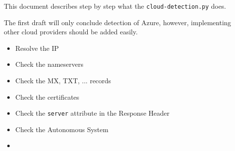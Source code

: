 \documentclass[12pt]{article}
\begin{document}
\thispagestyle{firstpage}

\begin{center}
    This document describes step by step what the \verb|cloud-detection.py| does. \\
\end{center}
The first draft will only conclude detection of Azure, however, implementing other cloud providers should be added easily.
\begin{itemize}
    \item Resolve the IP 
    \item Check the nameservers
    \item Check the MX, TXT, ... records
    \item Check the certificates
    \item Check the \verb|server| attribute in the Response Header
    \item Check the Autonomous System
    \item 
\end{itemize}
\end{document}
